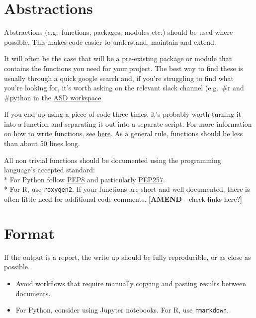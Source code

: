 \documentclass[]{book}
\providecommand{\tightlist}{%
  \setlength{\itemsep}{0pt}\setlength{\parskip}{0pt}}
\begin{document}
\hypertarget{functions}{%
\section*{Abstractions}\label{functions}}

Abstractions (e.g.~functions, packages, modules etc.) should be used where possible. This makes code easier to understand, maintain and extend.

It will often be the case that will be a pre-existing package or module that contains the functions you need for your project. The best way to find these is usually through a quick google search and, if you're struggling to find what you're looking for, it's worth asking on the relevant slack channel (e.g.~\#r and \#python in the \href{asdslack.slack.com}{ASD workspace}

If you end up using a piece of code three times, it's probably worth turning it into a function and separating it out into a separate script. For more information on how to write functions, see \href{https://github.com/moj-analytical-services/writing_functions_in_r}{here}. As a general rule, functions should be less than about 50 lines long.

All non trivial functions should be documented using the programming language's accepted standard:\\
* For Python follow \href{https://www.python.org/dev/peps/pep-0008/}{PEP8} and particularly \href{https://www.python.org/dev/peps/pep-0257/}{PEP257}.\\
* For R, use \texttt{roxygen2}.
If your functions are short and well documented, there is often little need for additional code comments.
{[}\textbf{AMEND} - check links here?{]}

\hypertarget{format}{%
\section{Format}\label{format}}

If the output is a report, the write up should be fully reproducible, or as close as possible.

\begin{itemize}
\tightlist
\item
  Avoid workflows that require manually copying and pasting results between documents.\\
\item
  For Python, consider using Jupyter notebooks. For R, use \texttt{rmarkdown}.
\end{itemize}
\end{document}
